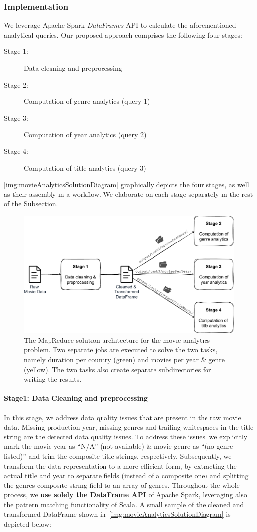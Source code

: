 \documentclass[acmlarge]{acmart}
\begin{document}
\subsubsection{Implementation} We leverage Apache Spark \emph{DataFrames} API to calculate the aforementioned analytical queries. Our proposed approach comprises the following four stages:
\begin{description}
  \item[Stage 1:] Data cleaning and preprocessing
  \item[Stage 2:] Computation of genre analytics (query 1)
  \item[Stage 3:] Computation of year analytics (query 2)
  \item[Stage 4:] Computation of title analytics (query 3)
\end{description}
\autoref{img:movieAnalyticsSolutionDiagram} graphically depicts the four stages, as well as their assembly in a workflow. We elaborate on each stage separately in the rest of the Subsection.

\begin{figure}[tb!]
  \centering
  \includegraphics[width=0.7\linewidth]{figures/movieAnalytics}
  \caption{The MapReduce solution architecture for the movie analytics problem. Two separate jobs are executed to solve the two tasks, namely duration per country (green) and movies per year \& genre (yellow). The two tasks also create separate subdirectories for writing the results.}
  \label{img:movieAnalyticsSolutionDiagram}
\end{figure}

\paragraph{Stage1: Data Cleaning and preprocessing} In this stage, we address data quality issues that are present in the raw movie data. Missing production year, missing genres and trailing whitespaces in the title string are the detected data quality issues. To address these issues, we explicitly mark the movie year as ``N/A'' (not available) \& movie genre as ``(no genre listed)'' and trim the composite title strings, respectively. Subsequently, we transform the data representation to a more efficient form, by extracting the actual title and year to separate fields (instead of a composite one) and splitting the genres composite string field to an array of genres. Throughout the whole process, we \textbf{use solely the DataFrame API} of Apache Spark, leveraging also the pattern matching functionality of Scala. A small sample of the cleaned and transformed DataFrame shown in~\autoref{img:movieAnalyticsSolutionDiagram} is depicted below:
\end{document}
